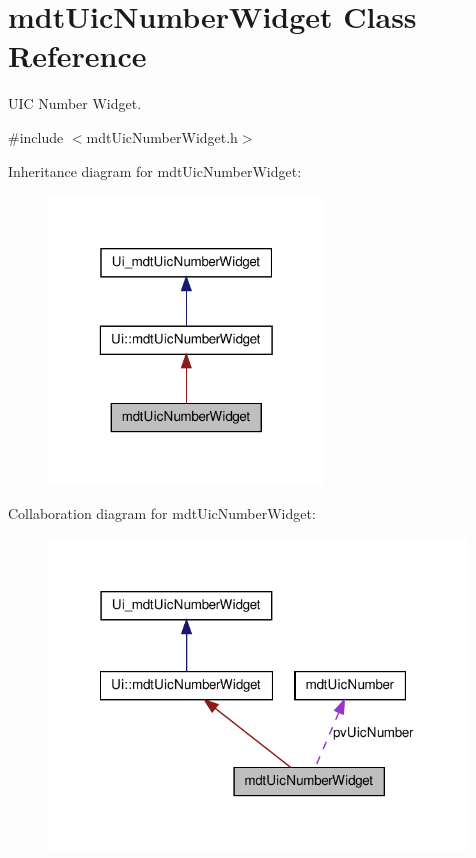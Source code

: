 \hypertarget{classmdt_uic_number_widget}{
\section{mdtUicNumberWidget Class Reference}
\label{classmdt_uic_number_widget}
}


UIC Number Widget.  




{\ttfamily \#include $<$mdtUicNumberWidget.h$>$}



Inheritance diagram for mdtUicNumberWidget:\nopagebreak
\begin{figure}[H]
\begin{center}
\leavevmode
\includegraphics[width=208pt]{classmdt_uic_number_widget__inherit__graph}
\end{center}
\end{figure}


Collaboration diagram for mdtUicNumberWidget:\nopagebreak
\begin{figure}[H]
\begin{center}
\leavevmode
\includegraphics[width=315pt]{classmdt_uic_number_widget__coll__graph}
\end{center}
\end{figure}
